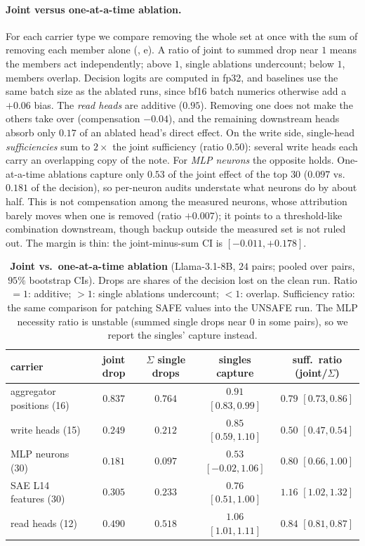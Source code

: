 \paragraph{Joint versus one-at-a-time ablation.} For each carrier type we compare removing the whole set at
once with the sum of removing each member alone (, e). A ratio of
joint to summed drop near $1$ means the members act independently; above $1$, single ablations undercount;
below $1$, members overlap. Decision logits are computed in fp32, and baselines use the same batch size as the
ablated runs, since bf16 batch numerics otherwise add a $+0.06$ bias. The \emph{read heads} are additive
($0.95$). Removing one does not make the others take over (compensation $-0.04$), and the remaining
downstream heads absorb only $0.17$ of an ablated head's direct effect. On the write side, single-head
\emph{sufficiencies} sum to $2\times$ the joint sufficiency (ratio $0.50$): several write heads each carry an
overlapping copy of the note. For \emph{MLP neurons} the opposite holds. One-at-a-time ablations capture only
$0.53$ of the joint effect of the top $30$ ($0.097$ vs.\ $0.181$ of the decision), so per-neuron audits
understate what neurons do by about half. This is not compensation among the measured neurons, whose
attribution barely moves when one is removed (ratio $+0.007$); it points to a threshold-like combination
downstream, though backup outside the measured set is not ruled out. The margin is thin: the joint-minus-sum
CI is $[-0.011, +0.178]$.

\begin{table}[tbp]
\centering\small
\caption{\textbf{Joint vs.\ one-at-a-time ablation} (Llama-3.1-8B, $24$ pairs; pooled over pairs, $95\%$
bootstrap CIs). Drops are shares of the decision lost on the clean run. Ratio $=1$: additive; $>1$: single
ablations undercount; $<1$: overlap. Sufficiency ratio: the same comparison for patching SAFE values into
the UNSAFE run. The MLP necessity ratio is unstable (summed single drops near $0$ in some pairs), so we report
the singles' capture instead.}
\label{tab:additivity}
\begin{tabular}{@{}lcccc@{}}
\toprule
carrier & joint drop & $\Sigma$ single drops & singles capture & suff.\ ratio (joint/$\Sigma$) \\
\midrule
aggregator positions (16) & $0.837$ & $0.764$ & $0.91$ $[0.83, 0.99]$ & $0.79$ $[0.73, 0.86]$ \\
write heads (15)          & $0.249$ & $0.212$ & $0.85$ $[0.59, 1.10]$ & $0.50$ $[0.47, 0.54]$ \\
MLP neurons (30)          & $0.181$ & $0.097$ & $0.53$ $[-0.02, 1.06]$ & $0.80$ $[0.66, 1.00]$ \\
SAE L14 features (30)     & $0.305$ & $0.233$ & $0.76$ $[0.51, 1.00]$ & $1.16$ $[1.02, 1.32]$ \\
read heads (12)           & $0.490$ & $0.518$ & $1.06$ $[1.01, 1.11]$ & $0.84$ $[0.81, 0.87]$ \\
\bottomrule
\end{tabular}
\end{table}

